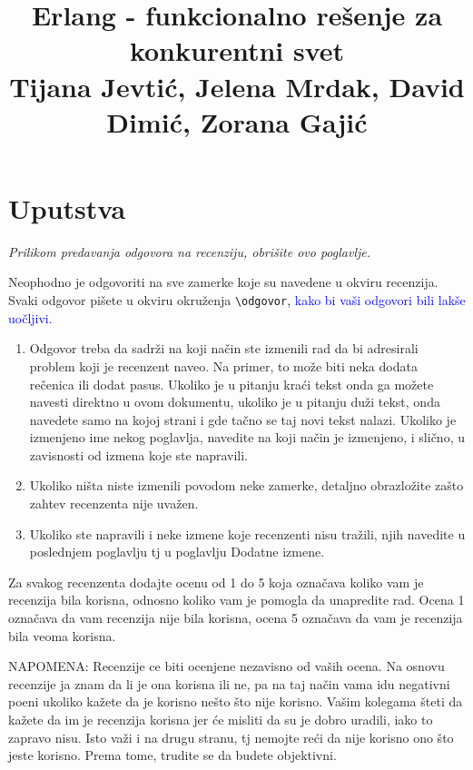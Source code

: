\documentclass[a4paper]{report}
\newcommand{\odgovor}[1]{\textcolor{blue}{#1}}
\begin{document}
\title{Erlang - funkcionalno rešenje za konkurentni svet\\ \small{Tijana Jevtić, Jelena Mrdak, David Dimić, Zorana Gajić}}

\maketitle

\tableofcontents

\chapter{Uputstva}
\emph{Prilikom predavanja odgovora na recenziju, obrišite ovo poglavlje.}

Neophodno je odgovoriti na sve zamerke koje su navedene u okviru recenzija. Svaki odgovor pišete u okviru okruženja \verb"\odgovor", \odgovor{kako bi vaši odgovori bili lakše uočljivi.} 
\begin{enumerate}

\item Odgovor treba da sadrži na koji način ste izmenili rad da bi adresirali problem koji je recenzent naveo. Na primer, to može biti neka dodata rečenica ili dodat pasus. Ukoliko je u pitanju kraći tekst onda ga možete navesti direktno u ovom dokumentu, ukoliko je u pitanju duži tekst, onda navedete samo na kojoj strani i gde tačno se taj novi tekst nalazi. Ukoliko je izmenjeno ime nekog poglavlja, navedite na koji način je izmenjeno, i slično, u zavisnosti od izmena koje ste napravili. 

\item Ukoliko ništa niste izmenili povodom neke zamerke, detaljno obrazložite zašto zahtev recenzenta nije uvažen.

\item Ukoliko ste napravili i neke izmene koje recenzenti nisu tražili, njih navedite u poslednjem poglavlju tj u poglavlju Dodatne izmene.
\end{enumerate}

Za svakog recenzenta dodajte ocenu od 1 do 5 koja označava koliko vam je recenzija bila korisna, odnosno koliko vam je pomogla da unapredite rad. Ocena 1 označava da vam recenzija nije bila korisna, ocena 5 označava da vam je recenzija bila veoma korisna. 

NAPOMENA: Recenzije ce biti ocenjene nezavisno od vaših ocena. Na osnovu recenzije ja znam da li je ona korisna ili ne, pa na taj način vama idu negativni poeni ukoliko kažete da je korisno nešto što nije korisno. Vašim kolegama šteti da kažete da im je recenzija korisna jer će misliti da su je dobro uradili, iako to zapravo nisu. Isto važi i na drugu stranu, tj nemojte reći da nije korisno ono što jeste korisno. Prema tome, trudite se da budete objektivni. 
\end{document}
